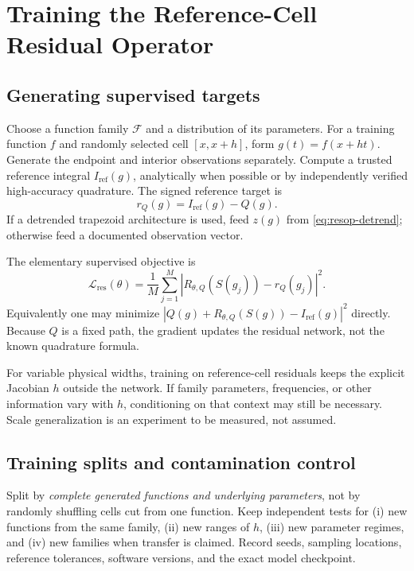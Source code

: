 \section{Training the Reference-Cell Residual Operator}
\label{sec:resop-training}

\subsection{Generating supervised targets}

Choose a function family $\mathcal F$ and a distribution of its parameters.
For a training function $f$ and randomly selected cell $[x,x+h]$, form
$g(t)=f(x+ht)$. Generate the endpoint and interior observations separately.
Compute a trusted reference integral $I_{\mathrm{ref}}(g)$, analytically
when possible or by independently verified high-accuracy quadrature.
The signed reference target is
\begin{equation}
    r_Q(g)=I_{\mathrm{ref}}(g)-Q(g).
    \label{eq:resop-label}
\end{equation}
If a detrended trapezoid architecture is used, feed $z(g)$ from
\eqref{eq:resop-detrend}; otherwise feed a documented observation vector.

The elementary supervised objective is
\begin{equation}
    \boxed{
        \mathcal L_{\mathrm{res}}(\theta)
        =\frac1M\sum_{j=1}^{M}
        \left|R_{\theta,Q}(S(g_j))-r_Q(g_j)\right|^2.
    }
    \label{eq:resop-loss}
\end{equation}
Equivalently one may minimize
$|Q(g)+R_{\theta,Q}(S(g))-I_{\mathrm{ref}}(g)|^2$ directly.
Because $Q$ is a fixed path, the gradient updates the residual network,
not the known quadrature formula.

For variable physical widths, training on reference-cell residuals keeps
the explicit Jacobian $h$ outside the network. If family parameters,
frequencies, or other information vary with $h$, conditioning on that
context may still be necessary. Scale generalization is an experiment
to be measured, not assumed.

\subsection{Training splits and contamination control}

Split by \emph{complete generated functions and underlying parameters},
not by randomly shuffling cells cut from one function. Keep independent
tests for (i) new functions from the same family, (ii) new ranges of $h$,
(iii) new parameter regimes, and (iv) new families when transfer is claimed.
Record seeds, sampling locations, reference tolerances, software versions,
and the exact model checkpoint.

